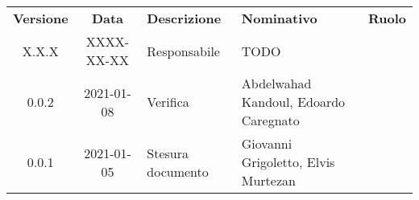 {
    \renewcommand{\arraystretch}{1.5}
    \centering
    \begin{longtable}{ c c  C{3.5cm}  C{3.5cm}  c }
        \rowcolor{\primaryColor}
        \textcolor{\secondaryColor}{
        \textbf{Versione}}     & \textcolor{\secondaryColor}{\textbf{Data}}       & \textcolor{\secondaryColor}
        {\textbf{Descrizione}} & \textcolor{\secondaryColor}{\textbf{Nominativo}} & \textcolor{\secondaryColor}{\textbf{Ruolo}}                          \\


        X.X.X  & 
        XXXX-XX-XX  & 
        Responsabile & 
        TODO & 
        \responsabile{} \\

        0.0.2  & 
        2021-01-08 & 
        Verifica & 
        Abdelwahad Kandoul, Edoardo Caregnato & 
        \verificatore{} \\
        
        0.0.1  & 
        2021-01-05 & 
        Stesura documento & 
        Giovanni Grigoletto, Elvis Murtezan  & 
        \redattore{} \\
    \end{longtable}
}